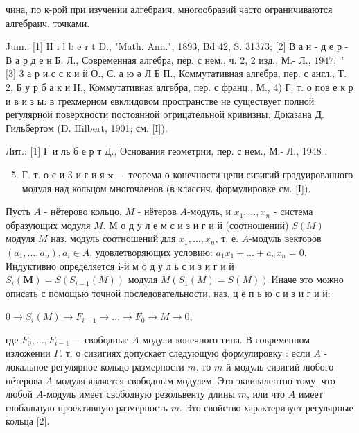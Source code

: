 \documentclass[10pt]{article}
\begin{document}
чина, по к-рой при изучении алгебраич. многообразий часто ограничиваются алгебраич. точками.



Jum.: [1] H i l b e r t D., "Math. Ann.", 1893, Bd 42, S. 31373; [2] В а н - д е р - В а р д е н Б. Л., Современная алгебра, пер. с нем., ч. 2, 2 изд., М.- Л., $1947 ;$ ' [3] 3 а р и с с к и й О., С. а ю ә Л Б П., Коммутативная алгебра, пер. с англ., Т. 2, Б у р б а к и Н., Коммутативная алгебра, пер. с франц., М., 4) Г. т. о пов е к р и в и з ы: в трехмерном евклидовом пространстве не существует полной регулярной поверхности постоянной отрицательной кривизны. Доказана Д. Гильбертом (D. Hilbert, 1901; см. [I]).



Лит.: [1] Г и ль б е р т Д., Основания геометрии, пер. с нем., М.- Л., 1948 .



\begin{enumerate}

  \setcounter{enumi}{4}

  \item Г. т. о с и 3 и г и я $\mathbf{x}-$ теорема о конечности цепи сизигий градуированного модуля над кольцом многочленов (в классич. формулировке см. [I]).

\end{enumerate}



Пусть $A$ - нётерово кольцо, $M$ - нётеров $A$-модуль, и $x_{1}, \ldots, x_{n}$ - система образующих модуля $M$. М о д у л е м с и з и г и й (соотношений) $S(M)$ модуля $M$ наз. модуль соотношений для $x_{1}, \ldots, x_{n}$, т. е. $A$-модуль векторов $\left(a_{1}, \ldots, a_{n}\right), a_{i} \in A$, удовлетворяющих условию: $a_{1} x_{1}+\ldots+a_{n} x_{n}=0$. Индуктивно определяется $\boldsymbol{i}$-й м о д у л ь с и з и г и й $S_{i}(\boldsymbol{M})=S\left(S_{i-1}(M)\right)$ модуля $M\left(S_{1}(M)=S(M)\right)$.Иначе это можно описать с помощью точной последовательности, наз. ц е п ь ю с и $з$ и г и й:



$0 \longrightarrow S_{i}(M) \longrightarrow F_{i-1} \longrightarrow \ldots \longrightarrow F_{0} \longrightarrow M \longrightarrow 0$,



где $F_{0}, \ldots, F_{i-1}-$ свободные $A$-модули конечного типа. В современном изложении $\Gamma$. т. о сизигиях допускает следующую формулировку : если $A$ - локальное регулярное кольцо размерности $m$, то $m$-й модуль сизигий любого нётерова $A$-модуля является свободным модулем. Это эквивалентно тому, что любой $A$-модуль имеет свободную резольвенту длины $m$, или что $A$ имеет глобальную проективную размерность $m$. Это свойство характеризует регулярные кольца [2].
\end{document}
